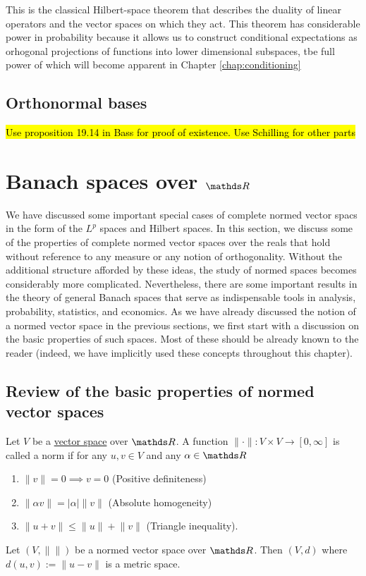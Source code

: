 This is the classical Hilbert-space theorem that describes the duality
of linear operators and the vector spaces on which they act. This
theorem has considerable power in probability because it allows us
to construct conditional expectations as orhogonal projections of
functions into lower dimensional subspaces, tbe full power of which
will become apparent in Chapter \ref{chap:conditioning}

\subsection{Orthonormal bases}

\hl{Use proposition 19.14 in Bass for proof of existence. Use Schilling for other parts}

\section{Banach spaces over $\protect\R$\label{sec:banach-R}}

We have discussed some important special cases of complete normed
vector spacs in the form of the $L^{p}$ spaces and Hilbert spaces.
In this section, we discuss some of the properties of complete normed
vector spaces over the reals that hold without reference to any measure
or any notion of orthogonality. Without the additional structure afforded
by these ideas, the study of normed spaces becomes considerably more
complicated. Nevertheless, there are some important results in the
theory of general Banach spaces that serve as indispensable tools in analysis,
probability, statistics, and economics. As we have already discussed
the notion of a normed vector space in the previous sections, we first
start with a discussion on the basic properties of such spaces. Most
of these should be already known to the reader (indeed, we have implicitly
used these concepts throughout this chapter).

\subsection{Review of the basic properties of normed vector spaces}
\begin{defn}
\label{def:normedVectorSpace}Let $V$ be a \hyperref[def:vectorSpace]{vector space}
over $\R$. A function $\lVert\cdot\rVert:V\times V\to\left[0,\infty\right]$
is called a norm if for any $u,v\in V$ and any $\alpha\in\R$
\end{defn}

\begin{enumerate}
\item $\lVert v\rVert=0\implies v=0$ (Positive definiteness)
\item $\lVert\alpha v\rVert=\lvert\alpha\rvert\lVert v\rVert$ (Absolute
homogeneity)
\item $\lVert u+v\rVert\leq\lVert u\rVert+\lVert v\rVert$ (Triangle inequality).
\end{enumerate}
\begin{prop}
\label{prop:normMetric}Let $\left(V,\lVert\rVert\right)$ be a normed
vector space over $\R$. Then $\left(V,d\right)$ where $d\left(u,v\right):=\lVert u-v\rVert$
is a metric space.
\end{prop}

